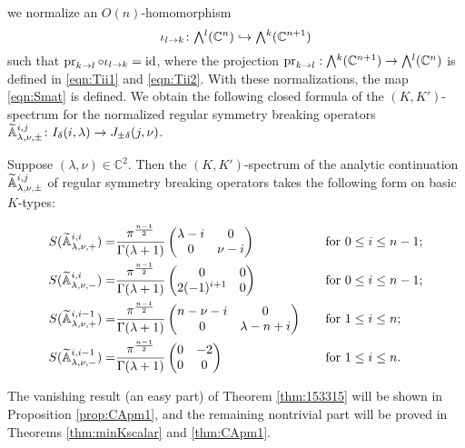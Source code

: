  we normalize an $O(n)$-homomorphism 
\[
   \iota_{l \to k}\colon \Exterior^l({\mathbb{C}}^n) 
         \hookrightarrow \Exterior^k({\mathbb{C}}^{n+1})
\]
 such that $\operatorname{pr}_{{k}\to{l}} \circ \iota_{l \to k}= {\operatorname{id}}$, 
 where the projection 
$\pr k l : \Exterior^k({\mathbb{C}}^{n+1}) \to \Exterior^l({\mathbb{C}}^{n})$
 is defined in \eqref{eqn:Tii1} and \eqref{eqn:Tii2}.  
With these normalizations,
 the map \eqref{eqn:Smat} is defined.  
We obtain the following closed formula
 of the $(K,K')$-spectrum for the normalized regular 
 symmetry breaking operators 
${\widetilde{\mathbb{A}}}_{{\lambda},{\nu},{\pm}}^{{i,j}} \colon I_{\delta}(i,\lambda) \to J_{\pm \delta}(j,\nu)$.  
\begin{theorem}
\label{thm:153315}
Suppose $(\lambda, \nu)\in {\mathbb{C}}^2$.  
Then the $(K,K')$-spectrum of the analytic continuation
 ${\widetilde{\mathbb{A}}}_{{\lambda},{\nu},{\pm}}^{{i,j}}$
 of regular symmetry breaking operators
 takes the following form on basic $K$-types:

\begin{alignat*}{2}
S({\widetilde{\mathbb{A}}}_{{\lambda},{\nu},{+}}^{{i,i}})
=&
\frac{\pi^{\frac{n-1}{2}}}{\Gamma(\lambda+1)}
\begin{pmatrix} \lambda-i & 0 \\ 0 & \nu-i \end{pmatrix}
\quad
&&
\text{for $0 \le i \le n-1$};
\\
S({\widetilde{\mathbb{A}}}_{{\lambda},{\nu},{-}}^{{i,i}})
=&
\frac{\pi^{\frac{n-1}{2}}}{\Gamma(\lambda+1)}
\begin{pmatrix}0 & 0 \\ 2(-1)^{i+1} & 0 \end{pmatrix}
\quad
&&
\text{for $0 \le i \le n-1$};
\\
S({\widetilde{\mathbb{A}}}_{{\lambda},{\nu},{+}}^{{i,i-1}})
=&
\frac{\pi^{\frac{n-1}{2}}}{\Gamma(\lambda+1)}
\begin{pmatrix} n-\nu-i & 0 \\ 0 & \lambda-n+i \end{pmatrix}
\quad
&&
\text{for $1 \le i \le n$};
\\
S({\widetilde{\mathbb{A}}}_{{\lambda},{\nu},{-}}^{{i,i-1}})
=&
\frac{\pi^{\frac{n-1}{2}}}{\Gamma(\lambda+1)}
\begin{pmatrix} 0 & -2 \\ 0 & 0 \end{pmatrix}
\quad
&&
\text{for $1 \le i \le n$}.
\end{alignat*}
\end{theorem}
The vanishing result (an easy part) of Theorem \ref{thm:153315}
 will be shown in Proposition \ref{prop:CApm1}, 
 and the remaining nontrivial part will be proved in Theorems \ref{thm:minKscalar} and \ref{thm:CApm1}.  



